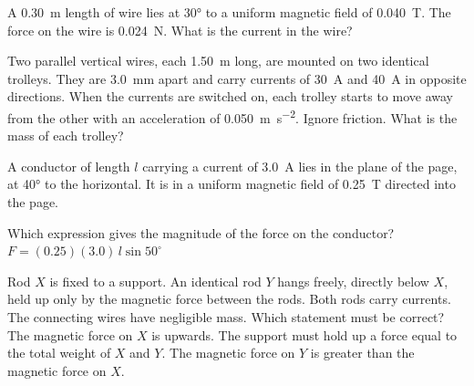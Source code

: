 \begin{quizq}{}
A \qty{0.30}{m} length of wire lies at \ang{30} to a uniform magnetic field of \qty{0.040}{T}. The force
on the wire is \qty{0.024}{N}. What is the current in the wire?
\end{quizq}

\begin{quizq}{}
Two parallel vertical wires, each \qty{1.50}{m} long, are mounted on two identical trolleys. They are
\qty{3.0}{mm} apart and carry currents of \qty{30}{A} and \qty{40}{A} in opposite directions. When the
currents are switched on, each trolley starts to move away from the other with an acceleration of
\qty{0.050}{m.s^{-2}}. Ignore friction. What is the mass of each trolley?
\end{quizq}

\begin{quizq}{}
A conductor of length $l$ carrying a current of \qty{3.0}{A} lies in the plane of the page, at \ang{40}
to the horizontal. It is in a uniform magnetic field of \qty{0.25}{T} directed into the page.
\begin{center}
\end{center}
Which expression gives the magnitude of the force on the conductor?
  {$F = (0.25)(3.0)\,l\sin 50^\circ$}
\end{quizq}

\begin{quizq}{}
Rod $X$ is fixed to a support. An identical rod $Y$ hangs freely, directly below $X$, held up only by
the magnetic force between the rods. Both rods carry currents. The connecting wires have negligible
mass. Which statement must be correct?
  {The magnetic force on $X$ is upwards.}
  {The support must hold up a force equal to the total weight of $X$ and $Y$.}
  {The magnetic force on $Y$ is greater than the magnetic force on $X$.}
\end{quizq}

